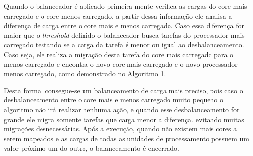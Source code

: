 Quando o balanceador é aplicado primeira mente verifica as cargas do core mais carregado e o core menos carregado, a partir dessa informação ele analisa a diferença de carga entre o core mais e menos carregado. Caso essa diferença for maior que o \textit{threshold} definido o balanceador busca tarefas do processador mais carregado testando se a carga da tarefa é menor ou igual ao desbalanceamento. Caso seja, ele realiza a migração desta tarefa do core mais carregado para o menos carregado e encontra o novo core mais carregado e o novo processador menos carregado, como demonstrado no Algoritmo 1. 

\begin{table}[h]
	\centering
\end{table} 

Desta forma, consegue-se um balanceamento de carga mais preciso, pois caso o desbalanceamento entre o core mais e menos carregado muito pequeno o algoritmo não irá realizar nenhuma ação, e quando esse desbalanceamento for grande ele migra somente tarefas que carga menor a diferença. evitando muitas migrações desnecessárias. Após a execução, quando não existem mais cores a serem mapeados e as cargas de todas as unidades de processamento possuem um valor próximo um do outro, o balanceamento é encerrado. 
